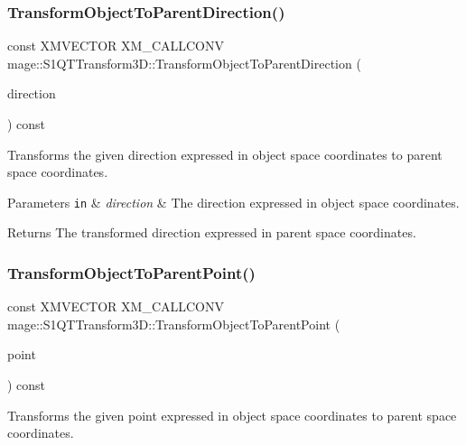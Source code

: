 \subsubsection{\texorpdfstring{Transform\+Object\+To\+Parent\+Direction()}{TransformObjectToParentDirection()}}
{\footnotesize\ttfamily const X\+M\+V\+E\+C\+T\+OR X\+M\+\_\+\+C\+A\+L\+L\+C\+O\+NV mage\+::\+S1\+Q\+T\+Transform3\+D\+::\+Transform\+Object\+To\+Parent\+Direction (\begin{DoxyParamCaption}\item[{F\+X\+M\+V\+E\+C\+T\+OR}]{direction }\end{DoxyParamCaption}) const\hspace{0.3cm}{\ttfamily [noexcept]}}

Transforms the given direction expressed in object space coordinates to parent space coordinates.


\begin{DoxyParams}[1]{Parameters}
\mbox{\tt in}  & {\em direction} & The direction expressed in object space coordinates. \\
\hline
\end{DoxyParams}
\begin{DoxyReturn}{Returns}
The transformed direction expressed in parent space coordinates. 
\end{DoxyReturn}
\mbox{\label{classmage_1_1_s1_q_t_transform3_d_a1b7e30a03037b902f7f2e08641b71a91}} 
\subsubsection{\texorpdfstring{Transform\+Object\+To\+Parent\+Point()}{TransformObjectToParentPoint()}}
{\footnotesize\ttfamily const X\+M\+V\+E\+C\+T\+OR X\+M\+\_\+\+C\+A\+L\+L\+C\+O\+NV mage\+::\+S1\+Q\+T\+Transform3\+D\+::\+Transform\+Object\+To\+Parent\+Point (\begin{DoxyParamCaption}\item[{F\+X\+M\+V\+E\+C\+T\+OR}]{point }\end{DoxyParamCaption}) const\hspace{0.3cm}{\ttfamily [noexcept]}}

Transforms the given point expressed in object space coordinates to parent space coordinates.


